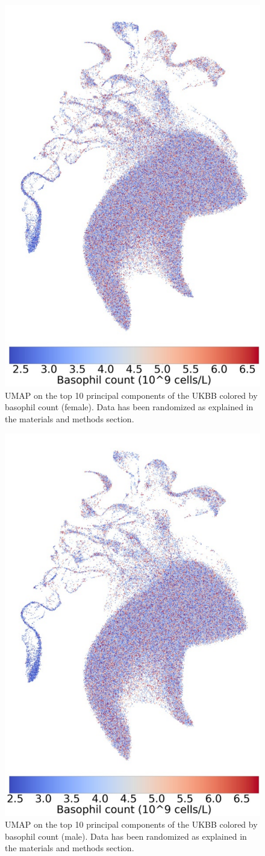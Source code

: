 \documentclass[12pt]{pnas-new}
\begin{document}
\begin{figure}
    \centering
    \includegraphics[width=0.4\columnwidth]{images/UKBB_UMAP_PC10_NN15_MD05_2018328174511_201871417039_basophill_count_pct5_f.pdf}
    \caption{UMAP on the top 10 principal components of the UKBB colored by basophil count (female). Data has been randomized as explained in the materials and methods section.}
    \label{fig:supp_ukbb_basophill_f}
\end{figure}

\begin{figure}
    \centering
    \includegraphics[width=0.4\columnwidth]{images/UKBB_UMAP_PC10_NN15_MD05_2018328174511_201871417039_basophill_count_pct5_m.pdf}
    \caption{UMAP on the top 10 principal components of the UKBB colored by basophil count (male). Data has been randomized as explained in the materials and methods section.}
    \label{fig:supp_ukbb_basophill_m}
\end{figure}
\end{document}
